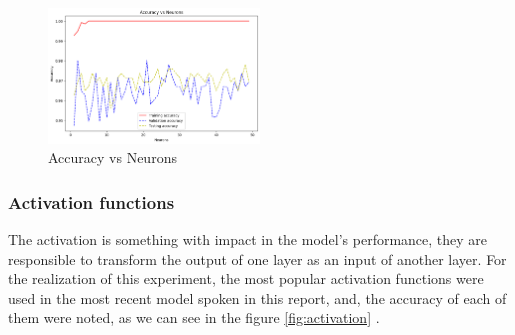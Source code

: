 \documentclass[12pt,a4paper,twocolumn]{article}
\begin{document}
\begin{figure}[H]
\includegraphics[width=0.5\textwidth]{images/neurons.png}
\centering
\caption{\label{fig:neurons} Accuracy vs Neurons}
\end{figure}
\subsubsection{Activation functions}
\par The activation is something with impact in the model's performance, they are responsible to transform the output of one layer as an input of another layer. For the realization of this experiment, the most popular activation functions were used in the most recent model spoken in this report, and, the accuracy of each of them were noted, as we can see in the figure \ref{fig:activation} .
\end{document}
